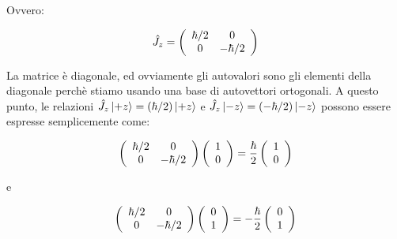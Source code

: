 Ovvero:
	
	\begin{equation}
		\hat{J}_z = 
			\left( \begin{array}{c c}
				\hbar / 2 & 0 \\
				0 &  - \hbar / 2 \\ 
			\end{array}
		\right )
	\end{equation}

La matrice \`e diagonale, ed ovviamente gli autovalori sono gli elementi della diagonale perch\`e stiamo usando una base di autovettori ortogonali. A questo punto, le relazioni $\hat{J}_z \ket{+z} = (\hbar / 2) \ket{+z}$ e $\hat{J}_z \ket{-z} = (- \hbar / 2) \ket{-z}$ possono essere espresse semplicemente come:

	\begin{equation}
		\left( \begin{array}{c c}
				\hbar / 2 & 0 \\
				0 &  - \hbar / 2 \\ 
			\end{array}
		\right )
		\left( \begin{array}{c}
				1 \\
				0 \\
			\end{array}
		\right ) = \frac{\hbar}{2} \left( \begin{array}{c}
				1 \\
				0 \\
			\end{array}
		\right )
	\end{equation}

e

	\begin{equation}
		\left( \begin{array}{c c}
				\hbar / 2 & 0 \\
				0 &  - \hbar / 2 \\ 
			\end{array}
		\right )
		\left( \begin{array}{c}
				0 \\
				1 \\
			\end{array}
		\right ) = -\frac{\hbar}{2} \left( \begin{array}{c}
				0 \\
				1 \\
			\end{array}
		\right ) 
	\end{equation}

